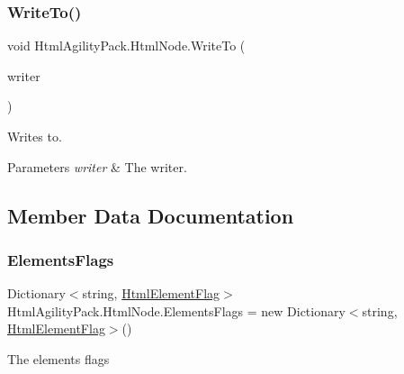 \subsubsection{\texorpdfstring{Write\+To()}{WriteTo()}\hspace{0.1cm}{\footnotesize\ttfamily [3/3]}}
{\footnotesize\ttfamily void Html\+Agility\+Pack.\+Html\+Node.\+Write\+To (\begin{DoxyParamCaption}\item[{Xml\+Writer}]{writer }\end{DoxyParamCaption})\hspace{0.3cm}{\ttfamily [inline]}}



Writes to. 


\begin{DoxyParams}{Parameters}
{\em writer} & The writer.\\
\hline
\end{DoxyParams}


\subsection{Member Data Documentation}
\mbox{\label{class_html_agility_pack_1_1_html_node_af13756973e13f0e57e468b2aa4f0d279}} 
\subsubsection{\texorpdfstring{Elements\+Flags}{ElementsFlags}}
{\footnotesize\ttfamily Dictionary$<$string, \hyperlink{namespace_html_agility_pack_a4db40c4f5c900094c5a7fba47320a34a}{Html\+Element\+Flag}$>$ Html\+Agility\+Pack.\+Html\+Node.\+Elements\+Flags = new Dictionary$<$string, \hyperlink{namespace_html_agility_pack_a4db40c4f5c900094c5a7fba47320a34a}{Html\+Element\+Flag}$>$()\hspace{0.3cm}{\ttfamily [static]}}



The elements flags 

\mbox{\label{class_html_agility_pack_1_1_html_node_a4fcdace39efc99e574203a53331c73ca}} 
